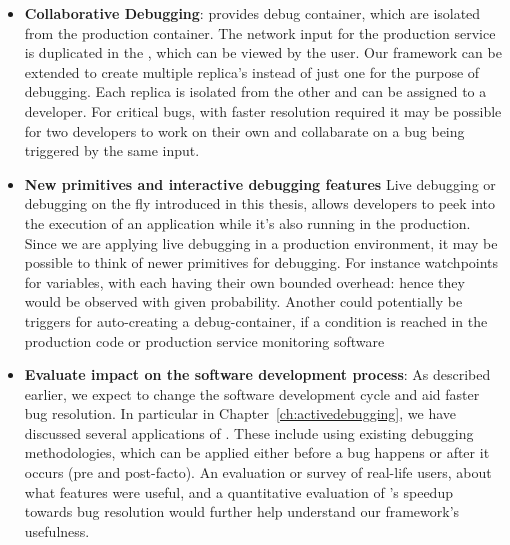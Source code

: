 \begin{itemize}
	
	\item \textbf{Collaborative Debugging}: \parikshan provides debug container, which are isolated from the production container. The network input for the production service is duplicated in the \debugcontainer, which can be viewed by the user. Our framework can be extended to create multiple replica's instead of just one for the purpose of debugging. Each replica is isolated from the other and can be assigned to a developer.
	For critical bugs, with faster resolution required it may be possible for two developers to work on their own \debugcontainer and collabarate on a bug being triggered by the same input.

	\item \textbf{New \livedebugging primitives and interactive debugging features}
	Live debugging or debugging on the fly introduced in this thesis, allows developers to peek into the execution of an application while it's also running in the production.
	Since we are applying live debugging in a production environment, it may be possible to think of newer primitives for debugging.	
	For instance watchpoints for variables, with each having their own bounded overhead: hence they would be observed with given probability.
	Another could potentially be triggers for auto-creating a debug-container, if a condition is reached in the production code or production service monitoring software	

	
	\item \textbf{Evaluate impact on the software development process}: 
	As described earlier, we expect \livedebugging to change the software development cycle and aid faster bug resolution.
	In particular in Chapter~\ref{ch:activedebugging}, we have discussed several applications of \parikshan. 
	These include using existing debugging methodologies, which can be applied either before a bug happens or after it occurs (pre and post-facto).
	An evaluation or survey of real-life users, about what features were useful, and a quantitative evaluation of \parikshan's speedup towards bug resolution would further help understand our framework's usefulness.
	
\end{itemize}
